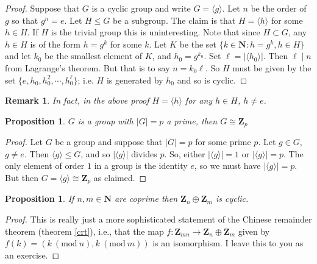 \documentclass[12pt]{article}
\numberwithin{equation}{subsection}
\newtheorem{prop}[subsection]{Proposition}
\theoremstyle{note}
\newtheorem{remark}[subsection]{Remark}
\newcommand{\Mod}[1]{\ (\mathrm{mod}\ #1)}
\begin{document}
\begin{proof}
	Suppose that $G$ is a cyclic group and write $G=\langle g\rangle$. Let $n$ be the order of $g$ so that $g^n=e$. Let $H\leq G$ be a subgroup. The claim is that $H=\langle h\rangle$ for some $h\in H$. If $H$ is the trivial group this is uninteresting. Note that since $H\subset G$, any $h\in H$ is of the form $h=g^k$ for some $k$. Let $K$ be the set $\{ k\in\mathbf{N} : h=g^k, h\in H\}$ and let $k_0$ be the smallest element of $K$, and $h_0=g^{k_0}$. Set $\ell=|\langle h_0\rangle|$. Then $\ell \mid n$ from Lagrange's theorem. But that is to say $n=k_0\ell$. So $H$ must be given by the set $\{e, h_0, h_0^2,\cdots,h_0^{\ell}\}$; i.e. $H$ is generated by $h_0$ and so is cyclic. 
\end{proof}

\begin{remark} 
In fact, in the above proof $H=\langle h\rangle$ for any $h\in H$, $h\neq e$. 

\end{remark}

\begin{prop} $G$ is a group with $|G|=p$ a prime, then $G\cong \mathbf{Z}_p$
\end{prop}

\begin{proof}
	Let $G$ be a group and suppose that $|G|=p$ for some prime $p$. Let $g\in G$, $g\neq e$. Then $\langle g\rangle \leq G$, and so $|\langle g\rangle |$ divides $p$. So, either $|\langle g \rangle |=1$ or $|\langle g \rangle |=p$. The only element of order $1$ in a group is the identity $e$, so we must have $|\langle g\rangle |=p$. But then $G=\langle g\rangle \cong \mathbf{Z}_p$ as claimed. 
\end{proof}

\begin{prop} \label{crt-group-version}
	If $n,m\in\mathbf{N}$ are coprime then $\mathbf{Z}_n \oplus \mathbf{Z}_m$ is cyclic. 
\end{prop}

\begin{proof}
This is really just a more sophisticated statement of the Chinese remainder theorem (theorem \ref{crt}), i.e., that the map $f\colon \mathbf{Z}_{mn}\to \mathbf{Z}_n\oplus \mathbf{Z}_m$ given by $f(k)=(k\Mod{n}, k\Mod{m})$ is an isomorphism. I leave this to you as an exercise.
\end{proof}

\end{document}
